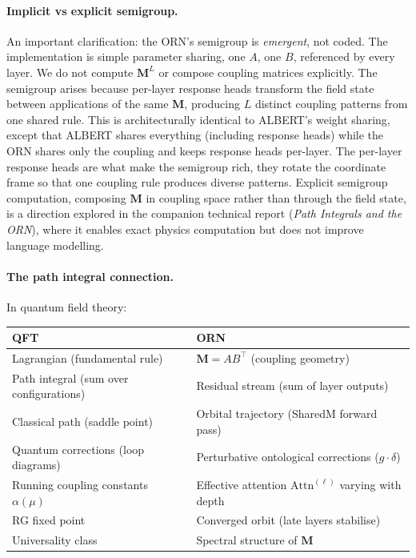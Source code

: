 \documentclass[11pt, a4paper]{article}
\newcommand{\M}{\mathbf{M}}
\theoremstyle{remark}
\begin{document}
\paragraph{Implicit vs explicit semigroup.}
An important clarification: the ORN's semigroup is \emph{emergent}, not coded.
The implementation is simple parameter sharing, one $A$, one $B$, referenced by every layer.
We do not compute $\M^L$ or compose coupling matrices explicitly.
The semigroup arises because per-layer response heads transform the field state between applications of the same $\M$, producing $L$ distinct coupling patterns from one shared rule.
This is architecturally identical to ALBERT's weight sharing, except that ALBERT shares everything (including response heads) while the ORN shares only the coupling and keeps response heads per-layer.
The per-layer response heads are what make the semigroup rich, they rotate the coordinate frame so that one coupling rule produces diverse patterns.
Explicit semigroup computation, composing $\M$ in coupling space rather than through the field state, is a direction explored in the companion technical report (\textit{Path Integrals and the ORN}), where it enables exact physics computation but does not improve language modelling.

\paragraph{The path integral connection.}
In quantum field theory:
\begin{center}\small
\begin{tabular}{@{}ll@{}}
\toprule
\textbf{QFT} & \textbf{ORN} \\
\midrule
Lagrangian (fundamental rule) & $\M = AB^\top$ (coupling geometry) \\
Path integral (sum over configurations) & Residual stream (sum of layer outputs) \\
Classical path (saddle point) & Orbital trajectory (SharedM forward pass) \\
Quantum corrections (loop diagrams) & Perturbative ontological corrections ($g \cdot \delta$) \\
Running coupling constants $\alpha(\mu)$ & Effective attention $\text{Attn}^{(\ell)}$ varying with depth \\
RG fixed point & Converged orbit (late layers stabilise) \\
Universality class & Spectral structure of $\M$ \\
\bottomrule
\end{tabular}
\end{center}
\end{document}
